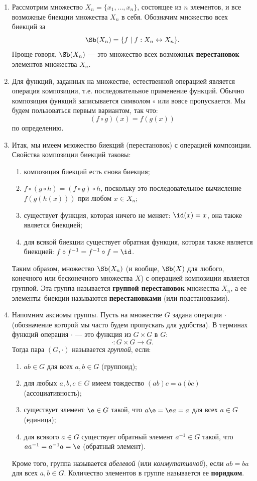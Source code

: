 \begin{enumerate}
\item Рассмотрим множество $X_n=\{x_1,\dots,x_n\}$, состоящее из $n$ элементов, и все возможные биекции множества $X_n$ в себя. Обозначим множество всех биекций за
$$
\Sb(X_n) = \{f\mid f:X_n\leftrightarrow X_n\}.
$$
Проще говоря, $\Sb(X_n)$ --- это множество всех возможных \textbf{перестановок} элементов множества $X_n$.
\item Для функций, заданных на множестве, естественной операцией является операция композиции, т.е. последовательное применение функций. Обычно композиция функций записывается символом $\circ$ или вовсе пропускается. Мы будем пользоваться первым вариантом, так что:
$$
(f\circ g)(x) = f(g(x))
$$
по определению.
\item Итак, мы имеем множество биекций (перестановок) с операцией композиции. Свойства композиции биекций таковы:
\begin{enumerate}[1.]
\item композиция биекций есть снова биекция;
\item $f\circ (g\circ h) = (f\circ g)\circ h$, поскольку это последовательное вычисление $f(g(h(x)))$ при любом $x\in X_n$;
\item существует функция, которая ничего не меняет: $\id(x)=x$, она также является биекцией;
\item для всякой биекции существует обратная функция, которая также является биекцией: $f\circ f^{-1}=f^{-1}\circ f=\id$.
\end{enumerate}

Таким образом, множество $\Sb(X_n)$ (и вообще, $\Sb(X)$ для любого, конечного или бесконечного множества $X$) с операцией композиции является группой. Эта группа называется \textbf{группой перестановок} множества $X_n$, а ее элементы--биекции называются \textbf{перестановками} (или подстановками).


\item Напомним аксиомы группы.
Пусть на множестве $G$ задана операция $\cdot$ (обозначение которой мы часто будем пропускать для удобства). В терминах функций операция $\cdot$ --- это функция из $G\times G$ в $G$:
$$
\cdot: G\times G\to G.
$$
Тогда пара $(G,\cdot)$ называется \textit{группой}, если:
\begin{enumerate}[G1]
\item $ab\in G$ для всех $a,b\in G$ (группоид);
\item для любых $a,b,c\in G$ имеем тождество $(ab)c=a(bc)$ (ассоциативность);
\item существует элемент $\e\in G$ такой, что $a\e=\e a=a$ для всех $a\in G$ (единица);
\item для всякого $a\in G$ существует обратный элемент $a^{-1}\in G$ такой, что $aa^{-1}=a^{-1}a=\e$ (обратный элемент).
\end{enumerate}
Кроме того, группа называется \textit{абелевой} (или \textit{коммутативной}), если $ab=ba$ для всех $a,b\in G$. Количество элементов в группе называется ее \textbf{порядком}.


\end{enumerate}
